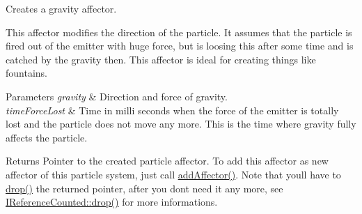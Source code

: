 Creates a gravity affector. 

This affector modifies the direction of the particle. It assumes that the particle is fired out of the emitter with huge force, but is loosing this after some time and is catched by the gravity then. This affector is ideal for creating things like fountains. 
\begin{DoxyParams}{Parameters}
{\em gravity} & Direction and force of gravity. \\
\hline
{\em time\+Force\+Lost} & Time in milli seconds when the force of the emitter is totally lost and the particle does not move any more. This is the time where gravity fully affects the particle. \\
\hline
\end{DoxyParams}
\begin{DoxyReturn}{Returns}
Pointer to the created particle affector. To add this affector as new affector of this particle system, just call \hyperlink{classirr_1_1scene_1_1IParticleSystemSceneNode_a401f5afbbb748878011c5ceb7d447f8b}{add\+Affector()}. Note that you\textquotesingle{}ll have to \hyperlink{classirr_1_1IReferenceCounted_a03856a09355b89d178090c4a5f738543}{drop()} the returned pointer, after you don\textquotesingle{}t need it any more, see \hyperlink{classirr_1_1IReferenceCounted_a03856a09355b89d178090c4a5f738543}{I\+Reference\+Counted\+::drop()} for more informations. 
\end{DoxyReturn}
\mbox{\label{classirr_1_1scene_1_1IParticleSystemSceneNode_a7e08b7e74a5295fd167769d5ee5a5161}} 
